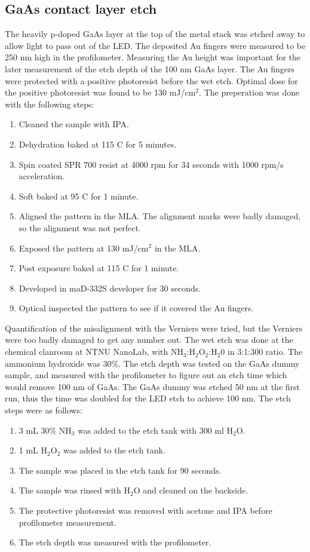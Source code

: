 \newpage
\subsection{GaAs contact layer etch}
\label{methods:wet_etch}
\noindent The heavily p-doped GaAs layer at the top of the metal stack was etched away to allow light to pass out of the LED.
The deposited Au fingers were measured to be 250 nm high in the profilometer.
Measuring the Au height was important for the later measurement of the etch depth of the 100 nm GaAs layer.
The Au fingers were protected with a positive photoresist before the wet etch.
Optimal dose for the positive photoresist was found to be 130 mJ/cm$^2$.
The preperation was done with the following steps:
\begin{enumerate}
    \item Cleaned the sample with IPA.
    \item Dehydration baked at 115 \textdegree C for 5 minutes.
    \item Spin coated SPR 700 resist at 4000 rpm for 34 seconds with 1000 rpm/s acceleration.
    \item Soft baked at 95 \textdegree C for 1 minute.
    \item Aligned the pattern in the MLA. The alignment marks were badly damaged, so the alignment was not perfect. %
    \item Exposed the pattern at 130 mJ/cm$^2$ in the MLA.
    \item Post exposure baked at 115 \textdegree C for 1 minute.
    \item Developed in maD-332S developer for 30 seconds.
    \item Optical inspected the pattern to see if it covered the Au fingers.
\end{enumerate}

Quantification of the misalignment with the Verniers were tried, but the Verniers were too badly damaged to get any number out.
The wet etch was done at the chemical clanroom at NTNU NanoLab, with NH$_3$:H$_2$O$_2$:H$_2$0 in 3:1:300 ratio.
The ammonium hydroxide was 30\%.
The etch depth was tested on the GaAs dummy sample, and measured with the profilometer to figure out an etch time which would remove 100 nm of GaAs.
The GaAs dummy was etched 50 nm at the first run, thus the time was doubled for the LED etch to achieve 100 nm.
The etch steps were as follows:

\begin{enumerate}
    \item 3 mL 30\% NH$_3$ was added to the etch tank with 300 ml H$_2$O.
    \item 1 mL H$_2$O$_2$ was added to the etch tank.
    \item The sample was placed in the etch tank for 90 seconds.
    \item The sample was rinsed with H$_2$O and cleaned on the backside.
    \item The protective photoresist was removed with acetone and IPA before profilometer measurement.
    \item The etch depth was measured with the profilometer.
\end{enumerate}



